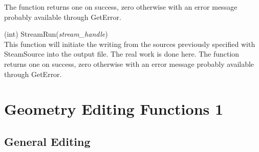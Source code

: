 \begin{description}
The function returns one on success, zero otherwise with an error
message probably available through {\vt GetError}.

\item{(int) \vt StreamRun({\it stream\_handle})}\\
This function will initiate the writing from the sources previously
specified with {\vt SteamSource} into the output file.  The real work
is done here.  The function returns one on success, zero otherwise
with an error message probably available through {\vt GetError}.

\end{description}


\section{Geometry Editing Functions 1}
\subsection{General Editing}

